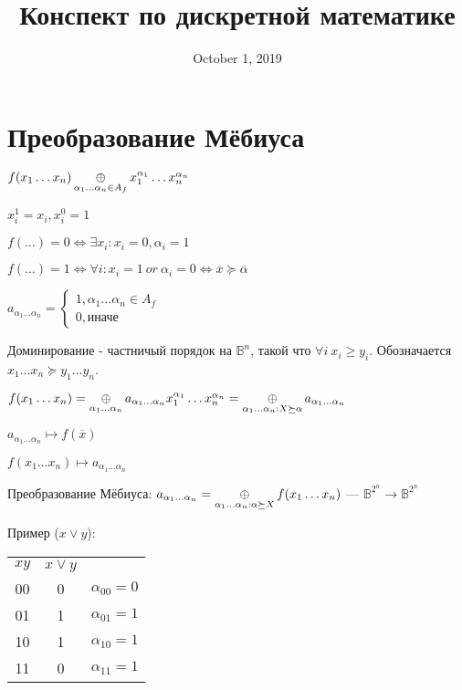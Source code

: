 

\title{Конспект по дискретной математике}
\date{October 1, 2019}


\maketitle

\section{Преобразование Мёбиуса}

$f(x_1\ldots x_n)\operatorname*{\oplus}\limits_{\alpha_1\ldots\alpha_n\in A_f} x_1^{\alpha_1}\ldots x_n^{\alpha_n}$

$x_i^1=x_i, x_i^0=1$

$f(\ldots) = 0 \Leftrightarrow \exists x_i: x_i=0, \alpha_i=1$

$f(\ldots) = 1 \Leftrightarrow \forall i: x_i=1 \ or \ \alpha_i=0 \Leftrightarrow \overline x \succeq \overline \alpha$

$a_{\alpha_1\ldots\alpha_n} = \begin{cases} 1, \alpha_1\ldots\alpha_n\in A_f \\ 0, \text{иначе} \end{cases}$

\begin{definition}
    Доминирование - частничый порядок на $\mathbb{B}^n$, такой что $\forall i \ x_i\geq y_i$. Обозначается $x_1\ldots x_n \succeq y_1\ldots y_n$.
\end{definition}

$f(x_1\ldots x_n)=\operatorname*{\oplus}\limits_{\alpha_1\ldots\alpha_n} a_{\alpha_1\ldots\alpha_n} x_1^{\alpha_1}\ldots x_n^{\alpha_n} = \operatorname*{\oplus}\limits_{\alpha_1\ldots\alpha_n: X\succeq \alpha} a_{\alpha_1\ldots\alpha_n}$

$a_{\alpha_1\ldots\alpha_n} \mapsto f(\overline{x})$

$f(x_1\ldots x_n) \mapsto a_{\alpha_1\ldots\alpha_n}$

\begin{theorem}
    Преобразование Мёбиуса: $a_{\alpha_1\ldots\alpha_n}=\operatorname*{\oplus}\limits_{\alpha_1\ldots\alpha_n: \alpha\succeq X}f(x_1\ldots x_n)$ --- $\mathbb{B}^{2^n}\to\mathbb{B}^{2^n}$
\end{theorem}

Пример ($x\vee y$): \begin{tabular}{ccc} $xy$&$x\vee y$& \\
    00&0&$\alpha_{00}=0$ \\
    01&1&$\alpha_{01}=1$ \\
    10&1&$\alpha_{10}=1$ \\
    11&0&$\alpha_{11}=1$ \\
\end{tabular}

